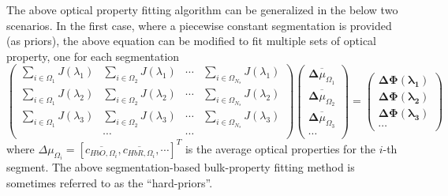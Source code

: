 \documentclass[12pt]{book}               %
\begin{document}
The above optical property fitting algorithm can be generalized in the below two scenarios. In the first case, where a piecewise constant segmentation is provided (as priors), the above equation can be modified to fit multiple sets of optical property, one for each segmentation
\begin{equation}\label{eq:multispectralseg}
\left(
\begin{array}{llll}
\sum_{i\in\Omega_1}{J}(\lambda_1) & \sum_{i\in\Omega_2}{J}(\lambda_1) & \cdots & \sum_{i\in\Omega_{N_s}}{J}(\lambda_1) \\
\sum_{i\in\Omega_1}{J}(\lambda_2) & \sum_{i\in\Omega_2}{J}(\lambda_2) & \cdots & \sum_{i\in\Omega_{N_s}}{J}(\lambda_2) \\
\sum_{i\in\Omega_1}{J}(\lambda_3) & \sum_{i\in\Omega_2}{J}(\lambda_3) & \cdots & \sum_{i\in\Omega_{N_s}}{J}(\lambda_3) \\
 & \cdots & \cdots 
\end{array}\right)
\left(
\begin{array}{c}
\overline{\boldsymbol{\Delta}{\mu_{\Omega_1}}}\\
\overline{\boldsymbol{\Delta}{\mu_{\Omega_2}}}\\
\overline{\boldsymbol{\Delta}{\mu_{\Omega_3}}}\\
\cdots
\end{array}
\right)=\left(
\begin{array}{c}
\boldsymbol{\Delta\Phi(\lambda_1)}\\
\boldsymbol{\Delta\Phi(\lambda_2)}\\
\boldsymbol{\Delta\Phi(\lambda_3)}\\
\cdots
\end{array}\right)
\end{equation}
where $\Delta\mu_{\Omega_i}=\left[\overline{c_{HbO,\Omega_i}},\overline{c_{HbR,\Omega_i}},\cdots\right]^T$ is the average optical properties for the $i$-th segment. The above segmentation-based bulk-property fitting method is sometimes referred to as the ``hard-priors''.
\end{document}
